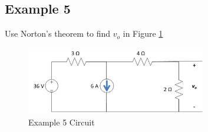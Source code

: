 \documentclass{handout}
\begin{document}
\subsection{Example 5}
Use Norton's theorem to find $v_o$ in Figure \ref{fig: Example5}
\begin{figure} [h t b]
\centering
\includegraphics[width=0.7\textwidth]{Example5.jpg}
\caption{Example 5 Circuit}
\label{fig: Example5}
\end{figure}


\newpage
\clearpage
\pagebreak
\end{document}
